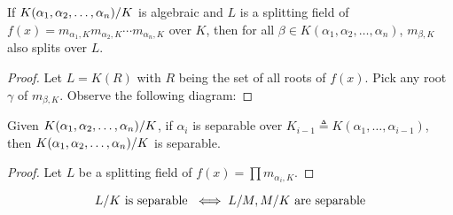 \begin{lemma}
  If ${K(\alpha_1, \alpha_2, \dots, \alpha_n)}/{K}$ is algebraic and $L$ is a splitting field of $f(x) = m_{\alpha_1, K}
  m_{\alpha_2, K} \cdots m_{\alpha_n, K}$ over $K$, then for all $\beta \in K(\alpha_1, \alpha_2, \dots, \alpha_n)$,
  $m_{\beta, K}$ also splits over $L$.

  \begin{proof}
    Let $L = K(R)$ with $R$ being the set of all roots of $f(x)$. Pick any root $\gamma$ of $m_{\beta, K}$.
    Observe the following diagram:
  \end{proof}
\end{lemma}

\begin{theorem}
  Given ${K(\alpha_1, \alpha_2, \dots, \alpha_n)}/{K}$, if $\alpha_i$ is
  separable over $K_{i-1} \triangleq K(\alpha_1, \dots, \alpha_{i-1})$, then
  ${K(\alpha_1, \alpha_2, \dots, \alpha_n)}/{K}$ is separable.

  \begin{proof}
    Let $L$ be a splitting field of $f(x) = \prod m_{\alpha_i, K}$.
  \end{proof}
\end{theorem}

\begin{theorem}
  \[ {L}/{K} \text{ is separable } \iff {L}/{M}, {M}/{K} \text{ are separable} \]
\end{theorem}
